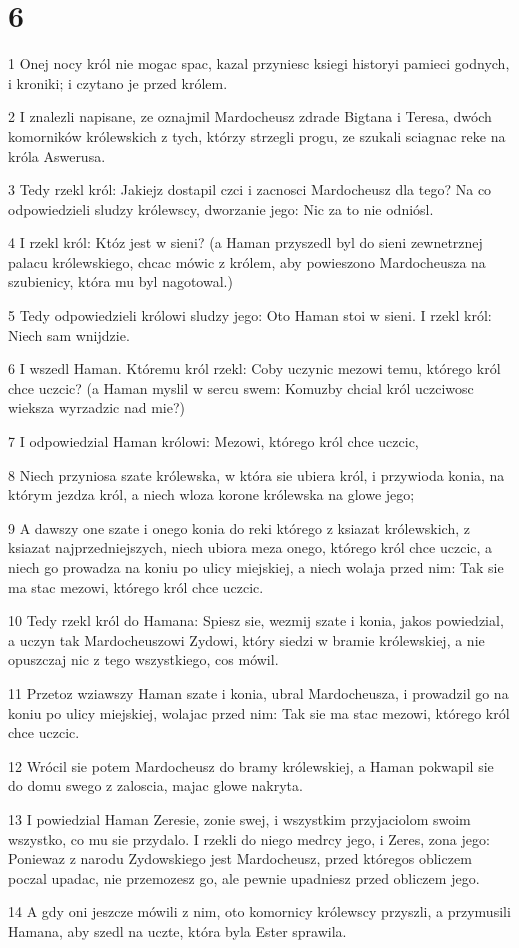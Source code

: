 \chapter{6}

\par 1 Onej nocy król nie mogac spac, kazal przyniesc ksiegi historyi pamieci godnych, i kroniki; i czytano je przed królem.
\par 2 I znalezli napisane, ze oznajmil Mardocheusz zdrade Bigtana i Teresa, dwóch komorników królewskich z tych, którzy strzegli progu, ze szukali sciagnac reke na króla Aswerusa.
\par 3 Tedy rzekl król: Jakiejz dostapil czci i zacnosci Mardocheusz dla tego? Na co odpowiedzieli sludzy królewscy, dworzanie jego: Nic za to nie odniósl.
\par 4 I rzekl król: Któz jest w sieni? (a Haman przyszedl byl do sieni zewnetrznej palacu królewskiego, chcac mówic z królem, aby powieszono Mardocheusza na szubienicy, która mu byl nagotowal.)
\par 5 Tedy odpowiedzieli królowi sludzy jego: Oto Haman stoi w sieni. I rzekl król: Niech sam wnijdzie.
\par 6 I wszedl Haman. Któremu król rzekl: Coby uczynic mezowi temu, którego król chce uczcic? (a Haman myslil w sercu swem: Komuzby chcial król uczciwosc wieksza wyrzadzic nad mie?)
\par 7 I odpowiedzial Haman królowi: Mezowi, którego król chce uczcic,
\par 8 Niech przyniosa szate królewska, w która sie ubiera król, i przywioda konia, na którym jezdza król, a niech wloza korone królewska na glowe jego;
\par 9 A dawszy one szate i onego konia do reki którego z ksiazat królewskich, z ksiazat najprzedniejszych, niech ubiora meza onego, którego król chce uczcic, a niech go prowadza na koniu po ulicy miejskiej, a niech wolaja przed nim: Tak sie ma stac mezowi, którego król chce uczcic.
\par 10 Tedy rzekl król do Hamana: Spiesz sie, wezmij szate i konia, jakos powiedzial, a uczyn tak Mardocheuszowi Zydowi, który siedzi w bramie królewskiej, a nie opuszczaj nic z tego wszystkiego, cos mówil.
\par 11 Przetoz wziawszy Haman szate i konia, ubral Mardocheusza, i prowadzil go na koniu po ulicy miejskiej, wolajac przed nim: Tak sie ma stac mezowi, którego król chce uczcic.
\par 12 Wrócil sie potem Mardocheusz do bramy królewskiej, a Haman pokwapil sie do domu swego z zaloscia, majac glowe nakryta.
\par 13 I powiedzial Haman Zeresie, zonie swej, i wszystkim przyjaciolom swoim wszystko, co mu sie przydalo. I rzekli do niego medrcy jego, i Zeres, zona jego: Poniewaz z narodu Zydowskiego jest Mardocheusz, przed któregos obliczem poczal upadac, nie przemozesz go, ale pewnie upadniesz przed obliczem jego.
\par 14 A gdy oni jeszcze mówili z nim, oto komornicy królewscy przyszli, a przymusili Hamana, aby szedl na uczte, która byla Ester sprawila.

